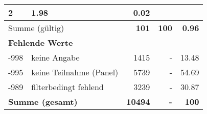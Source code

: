 \begin{longtable}{lXrrr}
       \num{2} &
       \num[round-mode=places,round-precision=2]{1,98} &
         \num[round-mode=places,round-precision=2]{0,02} \\
     \midrule
     \multicolumn{2}{l}{Summe (gültig)} &
       \textbf{\num{101}} &
     \textbf{100} &
       \textbf{\num[round-mode=places,round-precision=2]{0,96}} \\
     \multicolumn{5}{l}{\textbf{Fehlende Werte}}\\
       -998 &
       keine Angabe &
         \num{1415} &
        - &
         \num[round-mode=places,round-precision=2]{13,48} \\
       -995 &
       keine Teilnahme (Panel) &
         \num{5739} &
        - &
         \num[round-mode=places,round-precision=2]{54,69} \\
       -989 &
       filterbedingt fehlend &
         \num{3239} &
        - &
         \num[round-mode=places,round-precision=2]{30,87} \\
     \midrule
     \multicolumn{2}{l}{\textbf{Summe (gesamt)}} &
          \textbf{\num{10494}} &
        \textbf{-} &
        \textbf{100} \\
     \bottomrule
     \end{longtable}
     
